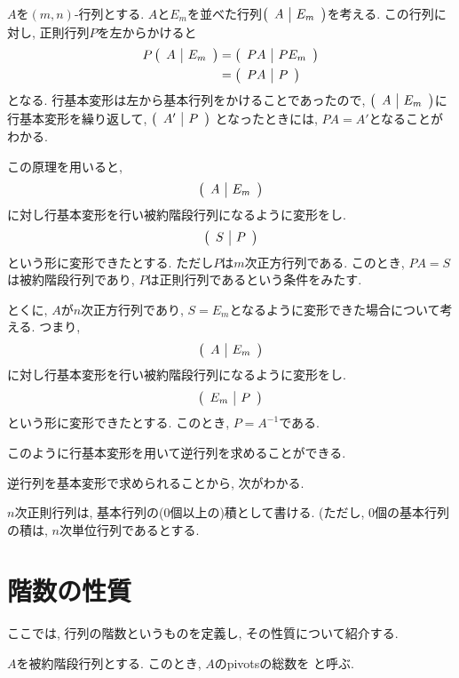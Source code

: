 \begin{remark}
  $A$を$(m,n)$-行列とする.
  $A$と$E_m$を並べた行列$\left(\begin{array}{c|c}A& E_m\end{array}\right)$を考える.
  この行列に対し, 正則行列$P$を左からかけると
  \begin{align*}
    P\left(\begin{array}{c|c}A& E_m\end{array}\right)&=\left(\begin{array}{c|c}PA& PE_m\end{array}\right)\\
    &=\left(\begin{array}{c|c}PA& P\end{array}\right)
  \end{align*}
  となる.
  行基本変形は左から基本行列をかけることであったので,
  $\left(\begin{array}{c|c}A& E_m\end{array}\right)$に行基本変形を繰り返して,
  $\left(\begin{array}{c|c}A'& P\end{array}\right)$
  となったときには, $PA=A'$となることがわかる.


  この原理を用いると,
  \begin{align*}
    \left(\begin{array}{c|c}A& E_m\end{array}\right)
  \end{align*}
  に対し行基本変形を行い被約階段行列になるように変形をし.
  \begin{align*}
    \left(\begin{array}{c|c}S& P\end{array}\right)
  \end{align*}
  という形に変形できたとする.
  ただし$P$は$m$次正方行列である.
  このとき, $PA=S$は被約階段行列であり, $P$は正則行列であるという条件をみたす.

  とくに, $A$が$n$次正方行列であり, $S=E_m$となるように変形できた場合について考える.
  つまり,
  \begin{align*}
    \left(\begin{array}{c|c}A& E_m\end{array}\right)
  \end{align*}
  に対し行基本変形を行い被約階段行列になるように変形をし.
  \begin{align*}
    \left(\begin{array}{c|c}E_m& P\end{array}\right)
  \end{align*}
  という形に変形できたとする.
  このとき, $P=A^{-1}$である.

  このように行基本変形を用いて逆行列を求めることができる.
\end{remark}

逆行列を基本変形で求められることから,
次がわかる.
\begin{cor}
  $n$次正則行列は,
  基本行列の($0$個以上の)積として書ける.
  (ただし, $0$個の基本行列の積は,
  $n$次単位行列であるとする.
\end{cor}


\section{階数の性質}
ここでは,
行列の階数というものを定義し,
その性質について紹介する.


\begin{definition}
  \label{def:rank:eche}
  $A$を被約階段行列とする.
  このとき,
  $A$のpivotsの総数を
  と呼ぶ.
\end{definition}

